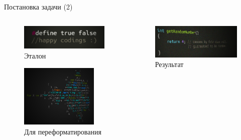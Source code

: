 \documentclass[sans]{beamer}
\begin{document}
\begin{frame}{Постановка задачи (2)}
	\begin{columns}[T]
		\begin{column}{.5\textwidth}
			\begin{figure}
				\includegraphics[width = \linewidth]{images/trueFalse.png}
				\caption{Эталон}
			\end{figure}
			\begin{figure}
				\includegraphics[height = 3cm, width = \linewidth]{images/mandel.png}
				\caption{Для переформатирования}
			\end{figure}
		\end{column}

		\pause

		\begin{column}{.5\textwidth}
		\begin{minipage}[c][0.8\textheight][c]{\linewidth}
			\begin{figure}[c]
				\includegraphics[width = \linewidth]{images/rand.png}
				\caption{Результат}
			\end{figure}
		\end{minipage}
		\end{column}
	\end{columns}
\end{frame}
\end{document}
